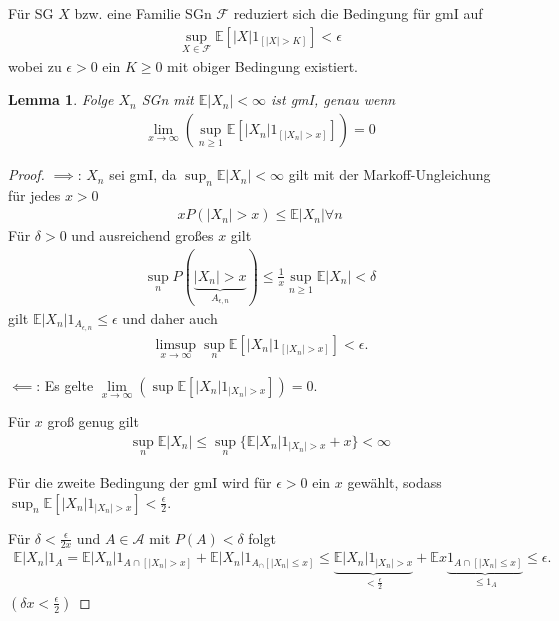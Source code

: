\documentclass[]{article}
\newtheorem{lemma}{Lemma}
\begin{document}
Für SG $X$ bzw. eine Familie SGn $\mathcal{F}$ reduziert sich die Bedingung für gmI auf 
\begin{align*}
	\sup_{X\in\mathcal{F}} \mathbb{E}[|X| 1_{[|X|>K]}] < \epsilon
\end{align*}
wobei zu $\epsilon > 0 $ ein $K \geq 0$ mit obiger Bedingung existiert.

\begin{lemma}
	Folge $X_n$ SGn mit $\mathbb{E}|X_n| < \infty$ ist gmI, genau wenn
	\begin{align*}
		\lim\limits_{x\rightarrow\infty} (\sup_{n\geq 1} \mathbb{E}[|X_n| 1_{[|X_n|>x]}]) = 0
	\end{align*}
\end{lemma}

\begin{proof}
	$\implies$: $X_n$ sei gmI, da $\sup_n \mathbb{E}|X_n| < \infty$ gilt mit der Markoff-Ungleichung für jedes $x>0$
	\begin{align*}
		x P(|X_n| > x) \leq \mathbb{E}|X_n| \forall n
	\end{align*}
	Für $\delta > 0$ und ausreichend großes $x$ gilt
	\begin{align*}
		\sup_n P(\underbrace{|X_n| > x}_{A_{\epsilon, n}}) \leq \frac{1}{x} \sup_{n\geq 1} \mathbb{E}|X_n| < \delta
	\end{align*}
	gilt $\mathbb{E}|X_n| 1_{A_{\epsilon, n}} \leq \epsilon$ und daher auch
	\begin{align*}
		\limsup_{x\rightarrow\infty} \sup_n \mathbb{E}[|X_n|1_{[|X_n|>x]}] < \epsilon.
	\end{align*}

	$\impliedby$: Es gelte $\lim\limits_{x\rightarrow\infty}(\sup \mathbb{E}[|X_n| 1_{|X_n|>x}]) = 0$.
	
	Für $x$ groß genug gilt
	\begin{align*}
		\sup_n \mathbb{E}|X_n| \leq \sup_n \{\mathbb{E}|X_n| 1_{|X_n| > x} + x\} < \infty
	\end{align*}
	
	Für die zweite Bedingung der gmI wird für $\epsilon > 0$ ein $x$ gewählt, sodass $\sup_n \mathbb{E}[|X_n| 1_{|X_n|>x}] < \frac{\epsilon}{2}$.
	
	Für $\delta < \frac{\epsilon}{2x}$ und $A\in\mathcal{A}$ mit $P(A)<\delta$ folgt
	\begin{align*}
		\mathbb{E}|X_n|1_A = \mathbb{E}|X_n| 1_{A\cap[|X_n|>x]} + \mathbb{E}|X_n|1_{A_\cap[|X_n| \leq x]} \leq \underbrace{\mathbb{E}|X_n|1_{|X_n|>x}}_{<\frac{\epsilon}{2}} + \mathbb{E}x\underbrace{1_{A\cap[|X_n|\leq x]}}_{\leq 1_A} \leq \epsilon.
	\end{align*}
	$(\delta x < \frac{\epsilon}{2})$
\end{proof}
\end{document}
